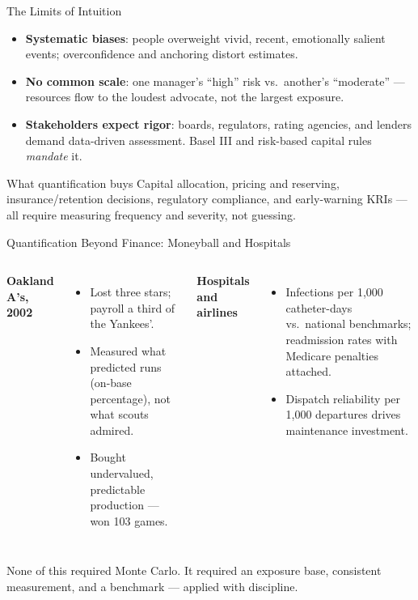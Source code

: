 \documentclass[11pt, aspectratio=169]{beamer}
\begin{document}
\begin{frame}{The Limits of Intuition}
\begin{itemize}
  \item \textbf{Systematic biases}: people overweight vivid, recent, emotionally salient events; overconfidence and anchoring distort estimates.
  \item \textbf{No common scale}: one manager's ``high'' risk vs.\ another's ``moderate'' --- resources flow to the loudest advocate, not the largest exposure.
  \item \textbf{Stakeholders expect rigor}: boards, regulators, rating agencies, and lenders demand data-driven assessment. Basel III and risk-based capital rules \emph{mandate} it.
\end{itemize}
\medskip
\begin{block}{What quantification buys}
Capital allocation, pricing and reserving, insurance/retention decisions, regulatory compliance, and early-warning KRIs --- all require measuring frequency and severity, not guessing.
\end{block}
\end{frame}

\begin{frame}{Quantification Beyond Finance: Moneyball and Hospitals}
\begin{columns}[T]
\textbf{Oakland A's, 2002}
\begin{itemize}
  \item Lost three stars; payroll a third of the Yankees'.
  \item Measured what predicted runs (\alert{on-base percentage}), not what scouts admired.
  \item Bought undervalued, predictable production --- won 103 games.
\end{itemize}
\textbf{Hospitals and airlines}
\begin{itemize}
  \item Infections per 1{,}000 catheter-days vs.\ national benchmarks; readmission rates with Medicare penalties attached.
  \item Dispatch reliability per 1{,}000 departures drives maintenance investment.
\end{itemize}
\end{columns}
\medskip
None of this required Monte Carlo. It required an \alert{exposure base}, consistent measurement, and a benchmark --- applied with discipline.
\end{frame}
\end{document}
